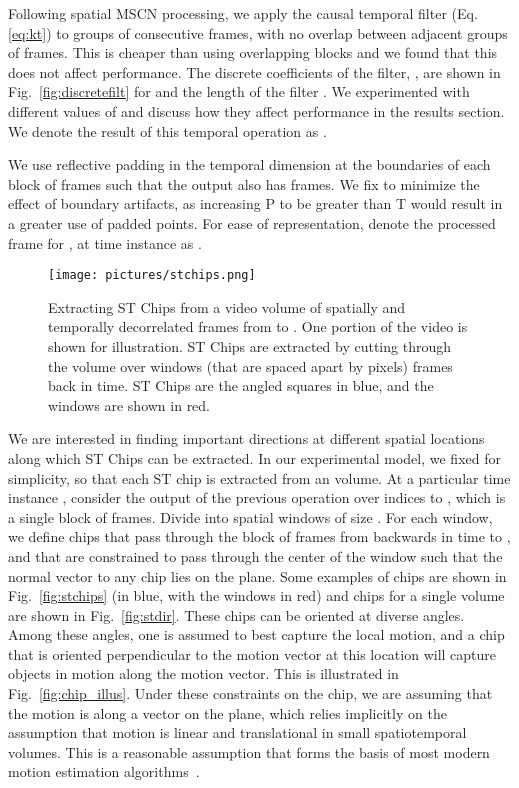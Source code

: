 \documentclass[journal]{IEEEtran}
\begin{document}
Following spatial MSCN processing, we apply the causal temporal filter (Eq.\ref{eq:kt}) to groups of  consecutive frames, with no overlap between adjacent groups of frames. This is cheaper than using overlapping blocks and we found that this does not affect performance. The discrete coefficients of the filter, , are shown in Fig.~\ref{fig:discretefilt} for  and the length of the filter . We experimented with different values of  and discuss how they affect performance in the results section. We denote the result of this temporal operation as .

We use reflective padding in the temporal dimension at the boundaries of each block of  frames such that the output also has  frames. We fix  to minimize the effect of boundary artifacts, as increasing P to be greater than T would result in a greater use of padded points. For ease of representation, denote the processed frame  for ,  at time instance  as . 

\begin{figure} 
  \texttt{[image: pictures/stchips.png]}
  \caption{Extracting ST Chips from a video volume of spatially and temporally decorrelated frames from  to . One portion of the video is shown for illustration. ST Chips are extracted by cutting through the volume over  windows (that are spaced apart by  pixels)  frames back in time. ST Chips are the angled squares in blue, and the windows are shown in red. }\label{fig:extract_stchips}
\vspace{-5mm}
\end{figure}



We are interested in finding important directions at different spatial locations along which ST Chips can be extracted. In our experimental model, we fixed  for simplicity, so that each ST chip is extracted from an  volume. At a particular time instance , consider the output of the previous operation  over indices  to , which is a single block of  frames. Divide  into spatial windows of size .  For each  window, we define chips that pass through the block of frames from    backwards in time to , and that are constrained to pass through the center of the  window such that the normal vector to any chip lies on the  plane. Some examples of chips are shown in  Fig.~\ref{fig:stchips} (in blue, with the  windows in red) and chips for a single  volume are shown in Fig.~\ref{fig:stdir}. These chips can be oriented at diverse angles. Among these angles, one is assumed to best capture the local motion, and a chip that is oriented perpendicular to the motion vector at this location will capture objects in motion along the motion vector. This is illustrated in Fig.~\ref{fig:chip_illus}. Under these constraints on the chip, we are assuming that the motion is along a vector on the  plane, which relies implicitly on the assumption that motion is linear and translational in small spatiotemporal volumes. This is a reasonable assumption that forms the basis of most modern motion estimation algorithms~\cite{horn,black}. 
\end{document}
